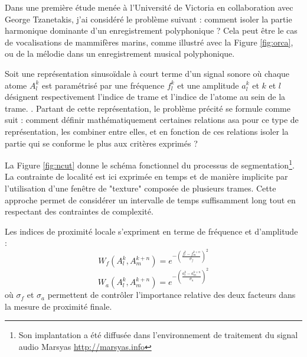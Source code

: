   Dans une première étude menée à l'Université de Victoria en collaboration avec George Tzanetakis, j'ai considéré le problème suivant : comment isoler la partie harmonique dominante d'un enregistrement polyphonique ?  Cela peut être le cas de vocalisations de mammifères marins, comme illustré avec la Figure \ref{fig:orca}, ou de la mélodie dans un enregistrement musical polyphonique.

  Soit une représentation sinusoïdale à court terme d'un signal sonore où chaque atome $A_l^k$ est paramétrisé par une fréquence $f_l^k$ et une amplitude $a_l^k$ et $k$ et $l$ désignent respectivement l'indice de trame et l'indice de l'atome au sein de la trame. . Partant de cette représentation, le problème précité se formule comme suit : comment définir mathématiquement certaines relations asa pour ce type de représentation, les combiner entre elles, et en fonction de ces relations isoler la partie qui se conforme le plus aux critères exprimés ?



La Figure \ref{fig:ncut} donne le schéma fonctionnel du processus de segmentation\footnote{Son implantation a été diffusée dans l'environnement de traitement du signal audio Marsyas \url{http://marsyas.info}}. La contrainte de localité est ici exprimée en temps et de manière implicite par l'utilisation d'une fenêtre de "texture" composée de plusieurs trames. Cette approche permet de considérer un intervalle de temps suffisamment long tout en respectant des contraintes de complexité.

Les indices de proximité locale s'expriment en terme de fréquence et d'amplitude :
  \begin{equation}
  W_f \left( A _ { l } ^ { k } , A _ { m } ^ { k + n } \right) = e ^ { - \left( \frac { f _ { l } ^ { k } - f _ { m } ^ { k + n } } { \sigma _ { f } } \right) ^ { 2 } }
  \end{equation}
  \begin{equation}
  W_a \left( A _ { l } ^ { k } , A _ { m } ^ { k + n } \right) =  e ^{ - \left( \frac { a _ { l } ^ { k } - a _ { m } ^ { k + n } } { \sigma _ { a } } \right) ^ { 2 } }
  \end{equation}
  où $\sigma _ { f }$ et $\sigma _ { a }$ permettent de contrôler l'importance relative des deux facteurs dans la mesure de proximité finale.

